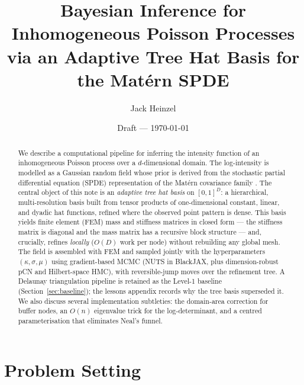 \documentclass[11pt]{article}
\title{Bayesian Inference for Inhomogeneous Poisson Processes\\
via an Adaptive Tree Hat Basis for the Mat\'ern SPDE}
\author{Jack Heinzel}
\date{Draft --- \today}
\begin{document}
\maketitle

\begin{abstract}
We describe a computational pipeline for inferring the intensity function of an
inhomogeneous Poisson process over a $d$-dimensional domain.
The log-intensity is modelled as a Gaussian random field whose prior is derived
from the stochastic partial differential equation (SPDE) representation of the
Mat\'ern covariance family \citep{lindgren2011}.
The central object of this note is an \emph{adaptive tree hat basis} on
$[0,1]^D$: a hierarchical, multi-resolution basis built from tensor products of
one-dimensional constant, linear, and dyadic hat functions, refined where the
observed point pattern is dense.  This basis yields finite element (FEM) mass
and stiffness matrices in closed form --- the stiffness matrix is diagonal and
the mass matrix has a recursive block structure --- and, crucially, refines
\emph{locally} ($O(D)$ work per node) without rebuilding any global mesh.  The
field is assembled with FEM and sampled jointly with the hyperparameters
$(\kappa, \sigma, \mu)$ using gradient-based MCMC (NUTS in BlackJAX, plus
dimension-robust pCN and Hilbert-space HMC), with reversible-jump moves over the
refinement tree.
A Delaunay triangulation pipeline is retained as the Level-1 baseline
(Section~\ref{sec:baseline}); the lessons appendix records why the tree basis
superseded it.
We also discuss several implementation subtleties: the domain-area correction
for buffer nodes, an $O(n)$ eigenvalue trick for the log-determinant, and a
centred parameterisation that eliminates Neal's funnel.
\end{abstract}

\tableofcontents
\bigskip

\section{Problem Setting}
\end{document}
